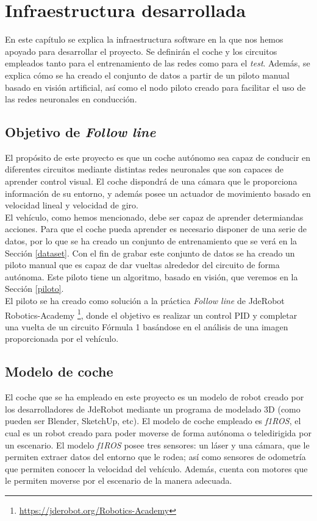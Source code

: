 \chapter{Infraestructura desarrollada}\label{cap.infraestructura}

En este capítulo se explica la infraestructura software en la que nos hemos apoyado  para desarrollar el proyecto. Se definirán el coche y los circuitos empleados tanto para el entrenamiento de las redes como para el \textit{test}. Además, se explica cómo se ha creado el conjunto de datos a partir de un piloto manual basado en visión artificial, así como el nodo piloto creado para facilitar el uso de las redes neuronales en conducción.


\section{Objetivo de \textit{Follow line}}

El propósito de este proyecto es que un coche autónomo sea capaz de conducir en diferentes circuitos mediante distintas redes neuronales que son capaces de aprender control visual. El coche dispondrá de una cámara que le proporciona información de su entorno, y además posee un actuador de movimiento basado en velocidad lineal y velocidad de giro.\\

El vehículo, como hemos mencionado, debe ser capaz de aprender determiandas acciones. Para que el coche pueda aprender es necesario disponer de una serie de datos, por lo que se ha creado un conjunto de entrenamiento que se verá en la Sección \ref{dataset}. Con el fin de grabar este conjunto de datos se ha creado un piloto manual que es capaz de dar vueltas alrededor del circuito de forma autónoma. Este piloto tiene un algoritmo, basado en visión, que veremos en la Sección \ref{piloto}.\\

El piloto se ha creado como solución a la práctica \textit{Follow line} de JdeRobot Robotics-Academy \footnote{\url{https://jderobot.org/Robotics-Academy}}, donde el objetivo es realizar un control PID y completar una vuelta de un circuito Fórmula 1 basándose en el análisis de una imagen proporcionada por el vehículo.


\section{Modelo de coche}

El coche que se ha empleado en este proyecto es un modelo de robot creado por los desarrolladores de JdeRobot mediante un programa de modelado 3D (como pueden ser Blender, SketchUp, etc). El modelo de coche empleado es \textit{f1ROS}, el cual es un robot creado para poder moverse de forma autónoma o teledirigida por un escenario. El modelo \textit{f1ROS} posee tres sensores: un láser y una cámara, que le permiten extraer datos del entorno que le rodea; así como sensores de odometría que permiten conocer la velocidad del vehículo. Además, cuenta con motores que le permiten moverse por el escenario de la manera adecuada.\\

